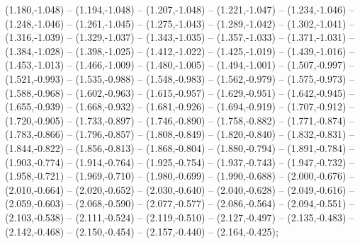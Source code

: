 (1.180,-1.048) -- (1.194,-1.048) -- (1.207,-1.048) -- (1.221,-1.047) -- (1.234,-1.046) -- (1.248,-1.046) -- (1.261,-1.045) -- (1.275,-1.043) -- (1.289,-1.042) -- (1.302,-1.041) -- (1.316,-1.039) -- (1.329,-1.037) -- (1.343,-1.035) -- (1.357,-1.033) -- (1.371,-1.031) -- (1.384,-1.028) -- (1.398,-1.025) -- (1.412,-1.022) -- (1.425,-1.019) -- (1.439,-1.016) -- (1.453,-1.013) -- (1.466,-1.009) -- (1.480,-1.005) -- (1.494,-1.001) -- (1.507,-0.997) -- (1.521,-0.993) -- (1.535,-0.988) -- (1.548,-0.983) -- (1.562,-0.979) -- (1.575,-0.973) -- (1.588,-0.968) -- (1.602,-0.963) -- (1.615,-0.957) -- (1.629,-0.951) -- (1.642,-0.945) -- (1.655,-0.939) -- (1.668,-0.932) -- (1.681,-0.926) -- (1.694,-0.919) -- (1.707,-0.912) -- (1.720,-0.905) -- (1.733,-0.897) -- (1.746,-0.890) -- (1.758,-0.882) -- (1.771,-0.874) -- (1.783,-0.866) -- (1.796,-0.857) -- (1.808,-0.849) -- (1.820,-0.840) -- (1.832,-0.831) -- (1.844,-0.822) -- (1.856,-0.813) -- (1.868,-0.804) -- (1.880,-0.794) -- (1.891,-0.784) -- (1.903,-0.774) -- (1.914,-0.764) -- (1.925,-0.754) -- (1.937,-0.743) -- (1.947,-0.732) -- (1.958,-0.721) -- (1.969,-0.710) -- (1.980,-0.699) -- (1.990,-0.688) -- (2.000,-0.676) -- (2.010,-0.664) -- (2.020,-0.652) -- (2.030,-0.640) -- (2.040,-0.628) -- (2.049,-0.616) -- (2.059,-0.603) -- (2.068,-0.590) -- (2.077,-0.577) -- (2.086,-0.564) -- (2.094,-0.551) -- (2.103,-0.538) -- (2.111,-0.524) -- (2.119,-0.510) -- (2.127,-0.497) -- (2.135,-0.483) -- (2.142,-0.468) -- (2.150,-0.454) -- (2.157,-0.440) -- (2.164,-0.425);
